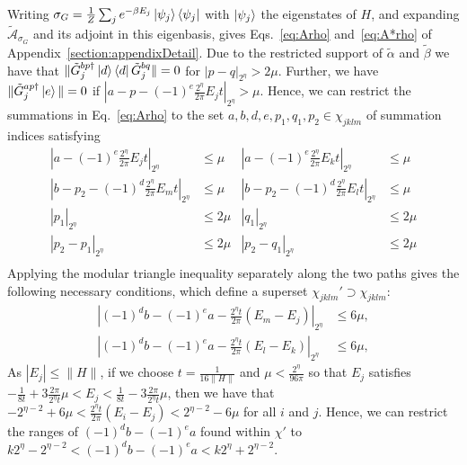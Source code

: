 \documentclass[aps,floatfix,10pt,amssymb,amsfont,amsmath,superscriptaddress,float,nofootinbib,longbibliography,nobalancelastpage,twocolumn]{revtex4-2}
\begin{document}
\begin{widetext}
Writing $\sigma_G = \frac{1}{Z}\sum_j e^{-\beta E_j} \ket{\psi_j}\bra{\psi_j}$ with $\ket{\psi_j}$ the eigenstates of $H$, and expanding $\tilde{\mathcal{A}}_{\sigma_G}$ and its adjoint in this eigenbasis, gives Eqs.~\eqref{eq:Arho} and~\eqref{eq:A*rho} of Appendix~\ref{section:appendixDetail}. Due to the restricted support of $\tilde \alpha$ and $\tilde \beta$ we have that $\|\tilde G^{bp\dagger}_{j}\ket{d}\bra{d}\tilde G^{bq}_{j}\| = 0$ for $|p-q|_{2^{\eta}} > 2\mu$. Further, we have $\|\tilde G^{ap \dagger}_j \ket{e}\| = 0$ if $|a-p-(-1)^e\frac{2^{\eta}}{2\pi}E_{j}t|_{2^{\eta}} > \mu$. Hence, we can restrict the summations in Eq.~\eqref{eq:Arho}  to the set $a,b,d,e,p_1,q_1,p_2 \in \chi_{jklm}$ of summation indices satisfying
\begin{equation}
\begin{aligned}
    |a-(-1)^e\frac{2^{\eta}}{2\pi}E_jt|_{2^{\eta}} &\leq \mu  &|a-(-1)^e\frac{2^{\eta}}{2\pi}E_kt|_{2^{\eta}} &\leq \mu\\
       |b-p_2-(-1)^{d}\frac{2^{\eta}}{2\pi}E_mt|_{2^{\eta}}& \leq \mu&|b-p_2-(-1)^{d}\frac{2^{\eta}}{2\pi}E_lt|_{2^{\eta}} &\leq \mu \\
    |p_1|_{2^{\eta}}&\leq 2\mu&  |q_1|_{2^{\eta}}&\leq 2\mu \\
    |p_2-p_1|_{2^{\eta}}&\leq 2\mu&  |p_2-q_1|_{2^{\eta}}&\leq 2\mu \\
\end{aligned}
\end{equation}
Applying the modular triangle inequality separately along the two paths gives the following necessary conditions, which define a superset $\chi_{jklm}'\supset\chi_{jklm}$:
\begin{equation}
\label{eq:condJ}
\begin{aligned}
    \left|(-1)^db -(-1)^ea-\frac{2^{\eta}t}{2\pi}(E_m-E_j)\right|_{2^{\eta}}&\leq 6\mu,\\
    \left|(-1)^db -(-1)^ea-\frac{2^{\eta}t}{2\pi}(E_l-E_k)\right|_{2^{\eta}}&\leq 6\mu,
\end{aligned}
\end{equation}
As $|E_j| \leq \|H\|$, if we choose $t = \frac{1}{16\|H\|}$ and $\mu < \frac{2^{\eta}}{96\pi}$ so that $E_j$ satisfies $-\frac{1}{8t} + 3\frac{2\pi}{2^{\eta}t}\mu < E_j < \frac{1}{8t} - 3\frac{2\pi}{2^{\eta}t}\mu$, then we have that $-2^{\eta-2}+6\mu < \frac{2^{\eta}t}{2\pi}(E_i -E_j) < 2^{\eta-2}-6\mu$ for all $i$ and $j$. Hence, we can restrict the ranges of $(-1)^db-(-1)^ea$ found within $\chi'$ to $k2^{\eta} - 2^{\eta-2}< (-1)^db-(-1)^ea < k2^{\eta} + 2^{\eta-2}$.

\end{widetext}
\end{document}
